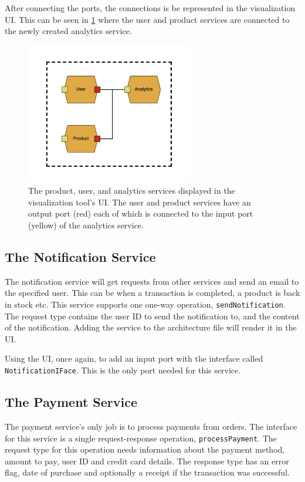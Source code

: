 After connecting the ports, the connections is be represented in the visualization UI. This can be seen in \cref{figure:jv_analytics} where the user and product services are connected to the newly created analytics service.

\begin{figure}[t]
    \center
    \includegraphics[width=0.65\textwidth]{figures/jv_analytics.png}
    \caption{The product, user, and analytics services displayed in the visualization tool's UI. The user and product services have an output port (red) each of which is connected to the input port (yellow) of the analytics service.}
    \label{figure:jv_analytics}
\end{figure}

\subsection{The Notification Service}
The notification service will get requests from other services and send an email to the specified user. This can be when a transaction is completed, a product is back in stock etc.
This service supports one one-way operation, \texttt{sendNotification}. The request type contains the user ID to send the notification to, and the content of the notification.
Adding the service to the architecture file will render it in the UI.

Using the UI, once again, to add an input port with the interface called \texttt{NotificationIFace}. This is the only port needed for this service.

\subsection{The Payment Service}
The payment service's only job is to process payments from orders. The interface for this service is a single request-response operation, \texttt{processPayment}.
The request type for this operation needs information about the payment method, amount to pay, user ID and credit card details. The response type has an error flag, date of purchase and optionally a receipt if the transaction was successful.

